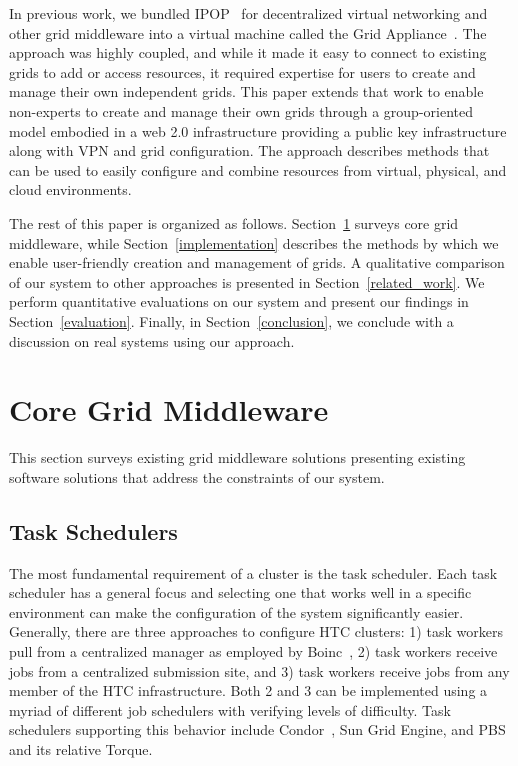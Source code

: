 \documentclass{sig-alternate}
\begin{document}
In previous work, we bundled IPOP~\cite{ipop} for decentralized virtual
networking and other grid middleware into a virtual machine called the
Grid Appliance~\cite{grid_appliance}.  The approach was highly coupled, and
while it made it easy to connect to existing grids to add or access resources,
it required expertise for users to create and manage their own independent
grids.  This paper extends that work to enable non-experts to create and manage
their own grids through a group-oriented model embodied in a web 2.0
infrastructure providing a public key infrastructure along with VPN and grid
configuration.  The approach describes methods that can be used to easily
configure and combine resources from virtual, physical, and cloud
environments.

The rest of this paper is organized as follows.  Section~\ref{middleware}
surveys core grid middleware, while Section~\ref{implementation} describes
the methods by which we enable user-friendly creation and management of grids.
A qualitative comparison of our system to other approaches is presented in
Section~\ref{related_work}.  We perform quantitative evaluations on our system
and present our findings in Section~\ref{evaluation}.  Finally, in
Section~\ref{conclusion}, we conclude with a discussion on real systems using
our approach.

\section{Core Grid Middleware}
\label{middleware}
This section surveys existing grid middleware solutions presenting existing
software solutions that address the constraints of our system.

\subsection{Task Schedulers}
The most fundamental requirement of a cluster is the task scheduler.  Each
task scheduler has a general focus and selecting one that works well in a
specific environment can make the configuration of the system significantly
easier.  Generally, there are three approaches to configure HTC clusters: 1)
task workers pull from a centralized manager as employed by Boinc~\cite{boinc},
2) task workers receive jobs from a centralized submission site, and 3) task
workers receive jobs from any member of the HTC infrastructure.  Both 2 and 3
can be implemented using a myriad of different job schedulers with verifying
levels of difficulty.  Task schedulers supporting this behavior include
Condor~\cite{condor0}, Sun Grid Engine, and PBS and its relative Torque.
\end{document}

